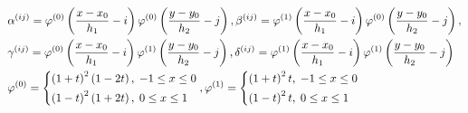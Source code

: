 \documentclass[fleqn, bachelor,subf,12pt,notitlepage]{article}
\begin{document}
\begin{equation}
\begin{aligned}
&\alpha^{(ij)} = \varphi^{(0)}\left(\dfrac{x-x_{0}}{h_{1}}-i\right) \varphi^{(0)}\left(\dfrac{y-y_{0}}{h_{2}}-j\right),  \beta^{(ij)} = \varphi^{(1)}\left(\dfrac{x-x_{0}}{h_{1}}-i\right) \varphi^{(0)}\left(\dfrac{y-y_{0}}{h_{2}}-j\right), \\
&\gamma^{(ij)} = \varphi^{(0)}\left(\dfrac{x-x_{0}}{h_{1}}-i\right) \varphi^{(1)}\left(\dfrac{y-y_{0}}{h_{2}}-j\right), \delta^{(ij)} = \varphi^{(1)}\left(\dfrac{x-x_{0}}{h_{1}}-i\right) \varphi^{(1)}\left(\dfrac{y-y_{0}}{h_{2}}-j\right)\\
&\varphi^{(0)}=\begin{dcases}
\left(1+t\right)^{2}\left(1-2t\right), \; -1\leq x \leq 0 \\
\left(1-t\right)^{2}\left(1+2t\right), \; 0\leq  x \leq  1 \\
\end{dcases}, \varphi^{(1)}=\begin{dcases}
\left(1+t\right)^{2}t, \; -1\leq  x \leq 0 \\
\left(1-t\right)^{2}t, \; 0\leq  x \leq 1 \\
\end{dcases}
\end{aligned}
\end{equation}
\end{document}
